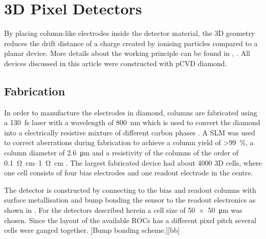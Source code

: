 \section{3D Pixel Detectors}
By placing column-like electrodes inside the detector material, the 3D geometry reduces the drift distance of a charge created by ionising particles compared to a planar device. More details about the working principle can be found in \cite{parker}, \cite{3D}. All devices discussed in this article were constructed with \ac{pCVD} diamond.
\subsection{Fabrication}
In order to manufacture the electrodes in diamond, columns are 
fabricated using a \SI{130}{\femto\second} laser with a wavelength of \SI{800}{\nano\meter} which is used to convert the diamond into a electrically resistive mixture of different carbon phases \cite{3dfab}. A \ac{SLM} was used to correct aberrations during fabrication to achieve a column yield of \SI{>99}{\%}, a column diameter of \SI{2.6}{\micro\meter} and a resistivity of the columns of the order of \SIrange{.1}{1}{\ohm\centi\meter} \cite{slm}. The largest fabricated device had about 4000 3D cells, where one cell consists of four bias electrodes and one readout electrode in the centre. \par
The detector is constructed by connecting to the bias and readout columns with surface metallisation and bump bonding the sensor to the readout electronics as shown in . For the detectors described herein a cell size of \SI{50x50}{\micro\meter} was chosen. Since the layout of the available \acp{ROC} has a different pixel pitch several cells were ganged together.
[Bump bonding scheme.][bb]
